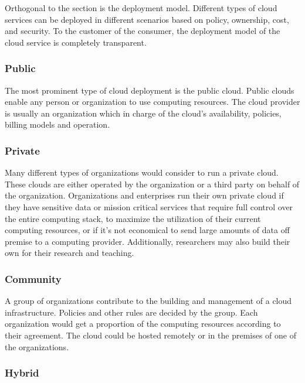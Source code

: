 \documentclass[12pt]{article}
\begin{document}
Orthogonal to the  section is the deployment model. Different types of cloud services can be deployed in different scenarios based on policy, ownership, cost, and security. To the customer of the consumer, the deployment model of the cloud service is completely transparent.

\subsubsection{Public} \label{ssub:deploy-public}

The most prominent type of cloud deployment is the public cloud. Public clouds enable any person or organization to use computing resources. The cloud provider is usually an organization which in charge of the cloud's availability, policies, billing models and operation.


\subsubsection{Private} \label{ssub:deploy-private}

Many different types of organizations would consider to run a private cloud. These clouds are either operated by the organization or a third party on behalf of the organization. Organizations and enterprises run their own private cloud if they have sensitive data or mission critical services that require full control over the entire computing stack, to maximize the utilization of their current computing resources, or if it's not economical to send large amounts of data off premise to a computing provider. Additionally, researchers may also build their own for their research and teaching.


\subsubsection{Community} \label{ssub:deploy-community}

A group of organizations contribute to the building and management of a cloud infrastructure. Policies and other rules are decided by the group. Each organization would get a proportion of the computing resources according to their agreement. The cloud could be hosted remotely or in the premises of one of the organizations.



\subsubsection{Hybrid} \label{ssub:deploy-hybrid}
\end{document}
